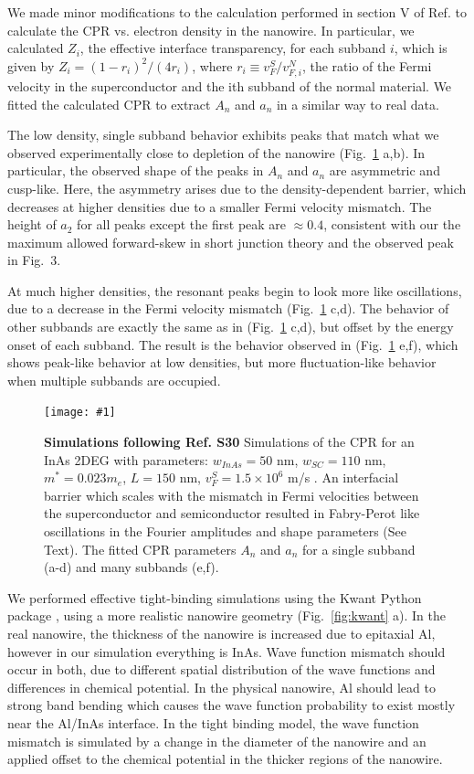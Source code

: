 \documentclass[11pt]{article}
\newcommand{\fig}[5]{
	\begin{figure}
	\centerline{\texttt{[image: \#1]}}
\caption[#3]{\label{#2} \textbf{#3} #4}
\end{figure}}
\begin{document}
We made minor modifications to the calculation performed in section V of Ref.  to calculate the CPR vs. electron density in the nanowire. In particular, we calculated $Z_i$, the effective interface transparency, for each subband $i$, which is given by $Z_i=(1-r_i)^2/(4r_i)$, where $r_i \equiv v_F^S / v_{F,i}^N$, the ratio of the Fermi velocity in the superconductor and the ith subband of the normal material. We fitted the calculated CPR to extract $A_n$ and $a_n$ in a similar way to real data. 

The low density, single subband behavior exhibits peaks that match what we observed experimentally close to depletion of the nanowire (Fig.~\ref{fig:furusaki} a,b). In particular, the observed shape of the peaks in $A_n$ and $a_n$ are asymmetric and cusp-like. Here, the asymmetry arises due to the density-dependent barrier, which decreases at higher densities due to a smaller Fermi velocity mismatch. The height of $a_2$ for all peaks except the first peak are $\approx 0.4$, consistent with our the maximum allowed forward-skew in short junction theory and the observed peak in Fig.~3. 

At much higher densities, the resonant peaks begin to look more like oscillations, due to a decrease in the Fermi velocity mismatch (Fig.~\ref{fig:furusaki} c,d). The behavior of other subbands are exactly the same as in (Fig.~\ref{fig:furusaki} c,d), but offset by the energy onset of each subband. The result is the behavior observed in (Fig.~\ref{fig:furusaki} e,f), which shows peak-like behavior at low densities, but more fluctuation-like behavior when multiple subbands are occupied. 

\fig{./furusaki.pdf}{fig:furusaki}
{Simulations following Ref. S30}
{Simulations of the CPR for an InAs 2DEG with parameters: $w_{InAs} = 50$ nm, $w_{SC} = 110$ nm, $m^* = 0.023 m_e$, $L = 150$ nm, $v_F^S = 1.5 \times 10^6$ m/s . An interfacial barrier which scales with the mismatch in Fermi velocities between the superconductor and semiconductor resulted in Fabry-Perot like oscillations in the Fourier amplitudes and shape parameters (See Text). The fitted CPR parameters $A_n$ and $a_n$ for a single subband (a-d) and many subbands (e,f).}{0.7}

We performed effective tight-binding simulations using the Kwant Python package , using a more realistic nanowire geometry (Fig.~\ref{fig:kwant} a). In the real nanowire, the thickness of the nanowire is increased due to epitaxial Al, however in our simulation everything is InAs. Wave function mismatch should occur in both, due to different spatial distribution of the wave functions and differences in chemical potential. In the physical nanowire, Al should lead to strong band bending which causes the wave function probability to exist mostly near the Al/InAs interface. In the tight binding model, the wave function mismatch is simulated by a change in the diameter of the nanowire and an applied offset to the chemical potential in the thicker regions of the nanowire.
\end{document}
